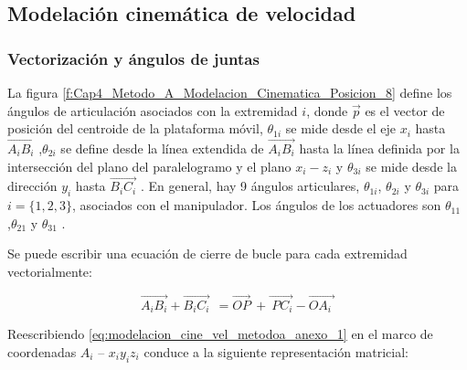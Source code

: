      \newpage
        
        
    \subsection{Modelación cinemática de velocidad}\label{anexomodelacionvelocidadmetodoa}
            \subsubsection{Vectorización y ángulos de juntas}
            
        La figura \ref{f:Cap4_Metodo_A_Modelacion_Cinematica_Posicion_8} define los ángulos de articulación asociados con la extremidad  $i$, donde  $\overrightarrow{p}$  es el vector de posición del centroide de la plataforma móvil, $\theta _{1i}$  se mide desde el eje $x_{i}$  hasta $\overrightarrow{A_{i}B_{i}}$ ,$\theta _{2i}$  se define desde la línea extendida de $\overrightarrow{A_{i}B_{i}}$  hasta la línea definida por la intersección del plano del paralelogramo y el plano $x_{i}-z_{i}$ y $\theta _{3i}$  se mide desde la dirección $y_{i}$ hasta $\overrightarrow{B_{i}C_{i}}$ . En general, hay 9 ángulos articulares, $\theta _{1i}$, $\theta _{2i}$ y $\theta _{3i}$ para $i= \{  1, 2, 3 \}$, asociados con el manipulador. Los ángulos de los actuadores son $\theta _{11}$ ,$\theta _{21}$ y $\theta _{31}$ .
        
        Se puede escribir una ecuación de cierre de bucle para cada extremidad vectorialmente:
        
        \begin{equation}
             \overrightarrow{A_{i}B_{i}}+ \overrightarrow{B_{i}C_{i}}~~ =\overrightarrow{OP}~ +\overrightarrow{~PC_{i}} -\overrightarrow{OA_{i}~}
             \label{eq:modelacion_cine_vel_metodoa_anexo_1}
        \end{equation}
        
        Reescribiendo \ref{eq:modelacion_cine_vel_metodoa_anexo_1} en el marco de coordenadas  $A_{i}$ –    $x_{i}y_{i}z_{i}$ conduce a la siguiente representación matricial:
        
